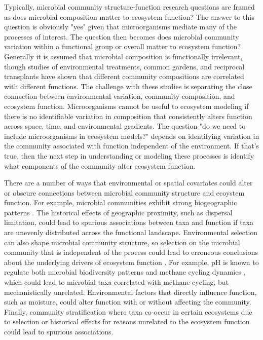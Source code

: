 \documentclass{article}
\begin{document}
Typically, microbial community structure-function research questions are framed
as does microbial composition matter to ecosystem function? The answer to this
question is obviously "yes" given that microorganisms mediate many of the
processes of interest. The question then becomes does microbial community
variation within a functional group or overall matter to ecosystem function? 
Generally it is assumed that microbial composition is functionally irrelevant, 
though studies of environmental treatments, common gardens, and reciprocal
transplants have shown that different community compositions are correlated with
different functions. The challenge with these studies is separating the close
connection between environmental variation, community composition, and ecosystem
function. Microorganisms cannot be useful to ecosystem modeling if there
is no identifiable variation in composition that consistently alters function
across space, time, and environmental gradients. The question "do we need to
include microorganisms in ecosystem models?" depends on identifying variation in
the community associated with function independent of the environment. If that's
true, then the next step in understanding or modeling these processes is 
identify what components of the community alter ecosystem function.

There are a number of ways that environmental or spatial covariates could alter
or obscure connections between microbial community structure and ecoystem
function. For example, microbial communities exhibit strong biogeographic
patterns \citep{martiny2006}. The historical effects of geographic proximity,
such as dispersal limitation, could lead to spurious associations between taxa
and function if taxa are unevenly distributed across the functional landscape.
Environmental selection can also shape microbial community structure, so
selection on the microbial community that is independent of the
process could lead to erroneous conclusions about the
underlying drivers of ecosystem function \citep{thompson2017}. For
example, pH is known to regulate both microbial biodiversity patterns
\citep{fierer2006} and methane cycling dynamics \citep{ye2012}, which could lead
to microbial taxa correlated with methane cycling, but mechanistically
unrelated. Environmental factors that directly influence function, such as
moisture, could alter function with or without affecting the community. 
Finally, community stratification where taxa co-occur in certain ecosystems due to
selection or historical effects for reasons unrelated to the ecosystem function
could lead to spurious associations.
\end{document}
